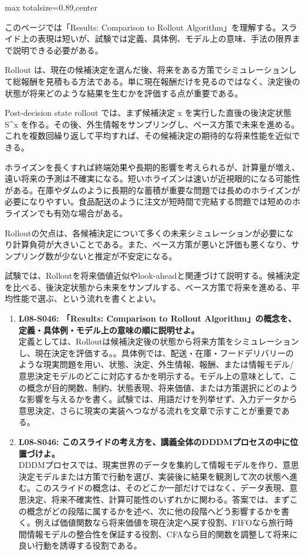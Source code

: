 \begin{minipage}[t]{0.58\textwidth}
\begin{adjustbox}{max totalsize={\textwidth}{0.89\textheight},center}
\begin{minipage}{\textwidth}\scriptsize
{}このページでは「Results: Comparison to Rollout Algorithm」を理解する。スライド上の表現は短いが、試験では定義、具体例、モデル上の意味、手法の限界まで説明できる必要がある。\par
Rollout は、現在の候補決定を選んだ後、将来をある方策でシミュレーションして総報酬を見積もる方法である。単に現在報酬だけを見るのではなく、決定後の状態が将来どのような結果を生むかを評価する点が重要である。\par
Post-decision state rollout では、まず候補決定 x を実行した直後の後決定状態 S\textasciicircum{}x を作る。その後、外生情報をサンプリングし、ベース方策で未来を進める。これを複数回繰り返して平均すれば、その候補決定の期待的な将来性能を近似できる。\par
ホライズンを長くすれば終端効果や長期的影響を考えられるが、計算量が増え、遠い将来の予測は不確実になる。短いホライズンは速いが近視眼的になる可能性がある。在庫やダムのように長期的な蓄積が重要な問題では長めのホライズンが必要になりやすい。食品配送のように注文が短時間で完結する問題では短めのホライズンでも有効な場合がある。\par
Rolloutの欠点は、各候補決定について多くの未来シミュレーションが必要になり計算負荷が大きいことである。また、ベース方策が悪いと評価も悪くなり、サンプリング数が少ないと推定が不安定になる。\par
試験では、Rolloutを将来価値近似やlook-aheadと関連づけて説明する。候補決定を比べる、後決定状態から未来をサンプルする、ベース方策で将来を進める、平均性能で選ぶ、という流れを書くとよい。\par{}\begin{enumerate}\item \textbf{L08-S046: 「Results: Comparison to Rollout Algorithm」の概念を、定義・具体例・モデル上の意味の順に説明せよ。}\\定義としては、Rolloutは候補決定後の状態から将来方策をシミュレーションし、現在決定を評価する。。具体例では、配送・在庫・フードデリバリーのような現実問題を用い、状態、決定、外生情報、報酬、または情報モデル/意思決定モデルのどこに対応するかを明示する。モデル上の意味として、この概念が目的関数、制約、状態表現、将来価値、または方策選択にどのような影響を与えるかを書く。試験では、用語だけを列挙せず、入力データから意思決定、さらに現実の実装へつながる流れを文章で示すことが重要である。\item \textbf{L08-S046: このスライドの考え方を、講義全体のDDDMプロセスの中に位置づけよ。}\\DDDMプロセスでは、現実世界のデータを集約して情報モデルを作り、意思決定モデルまたは方策で行動を選び、実装後に結果を観測して次の状態へ進む。このスライドの概念は、そのどこか一部だけではなく、データ表現、意思決定、将来不確実性、計算可能性のいずれかに関わる。答案では、まずこの概念がどの段階に属するかを述べ、次に他の段階へどう影響するかを書く。例えば価値関数なら将来価値を現在決定へ戻す役割、FIFOなら旅行時間情報モデルの整合性を保証する役割、CFAなら目的関数を調整して将来に良い行動を誘導する役割である。\end{enumerate}

\end{minipage}
\end{adjustbox}
\end{minipage}
